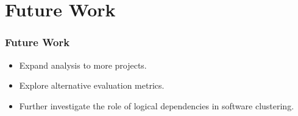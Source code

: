 \documentclass{beamer}
\begin{document}
\section{Future Work}

\begin{frame}
\frametitle{Future Work}
\begin{itemize}
    \item Expand analysis to more projects.
    \item Explore alternative evaluation metrics.
    \item Further investigate the role of logical dependencies in software clustering.
\end{itemize}
\end{frame}
\end{document}
